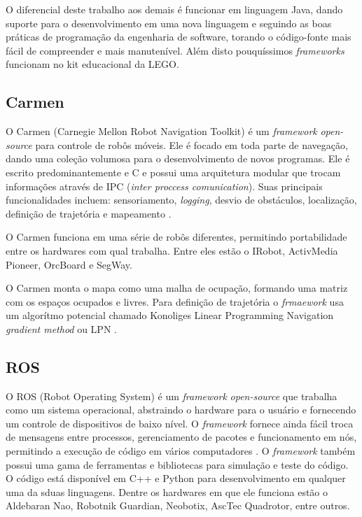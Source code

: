 O diferencial deste trabalho aos demais é funcionar em linguagem Java, dando suporte para o desenvolvimento em uma nova linguagem e seguindo as boas práticas de programação da engenharia de software, torando o código-fonte mais fácil de compreender e mais manutenível. Além disto pouquíssimos \textit{frameworks} funcionam no kit educacional da LEGO.

\subsection{Carmen}

O Carmen (Carnegie Mellon Robot Navigation Toolkit) é um \textit{framework} \textit{open-source} para controle de robôs móveis. Ele é focado em toda parte de navegação, dando uma coleção volumosa para o desenvolvimento de novos programas. Ele é escrito predominantemente e C e possui uma arquitetura modular que trocam informações através de IPC (\textit{inter proccess comunication}). Suas principais funcionalidades incluem: sensoriamento, \textit{logging}, desvio de obstáculos, localização, definição de trajetória e mapeamento \cite{CARMEN_SITE}. 

O Carmen funciona em uma série de robôs diferentes, permitindo portabilidade entre os hardwares com qual trabalha. Entre eles estão o IRobot, ActivMedia Pioneer, OrcBoard e SegWay.

O Carmen monta o mapa como uma malha de ocupação, formando uma matriz com os espaços ocupados e livres. Para definição de trajetória o \textit{frmaework} usa um algorítmo potencial chamado Konoliges Linear Programming Navigation \textit{gradient method} ou LPN \cite{Thomsen2010}.

\subsection{ROS}

O ROS (Robot Operating System) é um \textit{framework} \textit{open-source} que trabalha como um sistema operacional, abstraindo o hardware para o usuário e fornecendo um controle de dispositivos de baixo nível. O \textit{framework} fornece ainda fácil troca de mensagens entre processos, gerenciamento de pacotes e funcionamento em nós, permitindo a execução de código em vários computadores \cite{ROS_SITE}. O \textit{framework} também possui uma gama de ferramentas e bibliotecas para simulação e teste do código. O código está disponível em C++ e Python para desenvolvimento em qualquer uma da sduas linguagens. Dentre os hardwares em que ele funciona estão o Aldebaran Nao, Robotnik Guardian, Neobotix, AscTec Quadrotor, entre outros.

